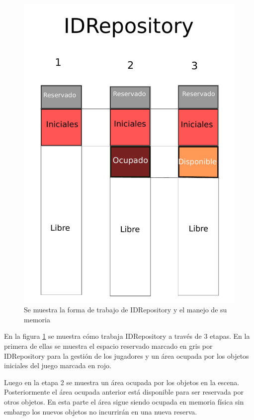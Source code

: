 \documentclass[a4paper,12pt,openany,oneside]{book}
\begin{document}
\begin{figure}
\begin{center}
\includegraphics[scale=0.3]{repository.pdf} 
\end{center}
\caption[Forma de trabajo IDRepository]{Se muestra la forma de trabajo de IDRepository y el manejo de su memoria}
\label{repositorylabel}
\end{figure}
En la figura \ref{repositorylabel} se muestra cómo trabaja IDRepository a través de 3 etapas. En la primera de ellas se muestra el espacio reservado marcado en gris por IDRepository para la gestión de los jugadores y un área ocupada por los objetos iniciales del juego marcada en rojo.

Luego en la etapa 2 se muestra un área ocupada por los objetos en la escena. Posteriormente el área ocupada anterior está disponible para ser reservada por otros objetos. En esta parte el área sigue siendo ocupada en memoria física sin embargo los nuevos objetos no incurrirán en una nueva reserva.
\end{document}
